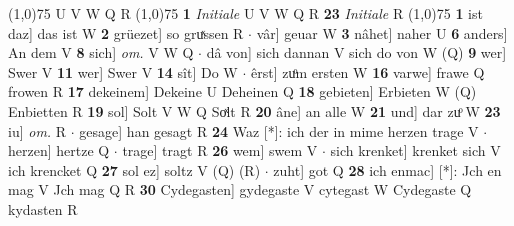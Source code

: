 \documentclass[8pt,a4paper,notitlepage]{article}
\begin{document}
\begin{table}[ht]
\begin{minipage}[t]{0.5\linewidth}
\begin{tabular}{rl}
\end{tabular}
\scriptsize
\line(1,0){75} \newline
U V W Q R \newline
\line(1,0){75} \newline
\textbf{1} \textit{Initiale} U V W Q R  \textbf{23} \textit{Initiale} R  \newline
\line(1,0){75} \newline
\textbf{1} ist daz] das ist W \textbf{2} grüezet] so gruͯssen R  $\cdot$ vâr] geuar W \textbf{3} nâhet] naher U \textbf{6} anders] An dem V \textbf{8} sich] \textit{om.} V W Q  $\cdot$ dâ von] sich dannan V sich do von W (Q) \textbf{9} wer] Swer V \textbf{11} wer] Swer V \textbf{14} sît] Do W  $\cdot$ êrst] zuͦm ersten W \textbf{16} varwe] frawe Q frowen R \textbf{17} dekeinem] Dekeine U Deheinen Q \textbf{18} gebieten] Erbieten W (Q) Enbietten R \textbf{19} sol] Solt V W Q Soͯlt R \textbf{20} âne] an alle W \textbf{21} und] dar zuͦ W \textbf{23} iu] \textit{om.} R  $\cdot$ gesage] han gesagt R \textbf{24} Waz [*]: ich der in mime herzen trage V  $\cdot$ herzen] hertze Q  $\cdot$ trage] tragt R \textbf{26} wem] swem V  $\cdot$ sich krenket] krenket sich V ich krencket Q \textbf{27} sol ez] soltz V (Q) (R)  $\cdot$ zuht] got Q \textbf{28} ich enmac] [*]: Jch en mag V Jch mag Q R \textbf{30} Cydegasten] gydegaste V cytegast W Cydegaste Q kydasten R \newline
\end{minipage}
\end{table}
\end{document}
